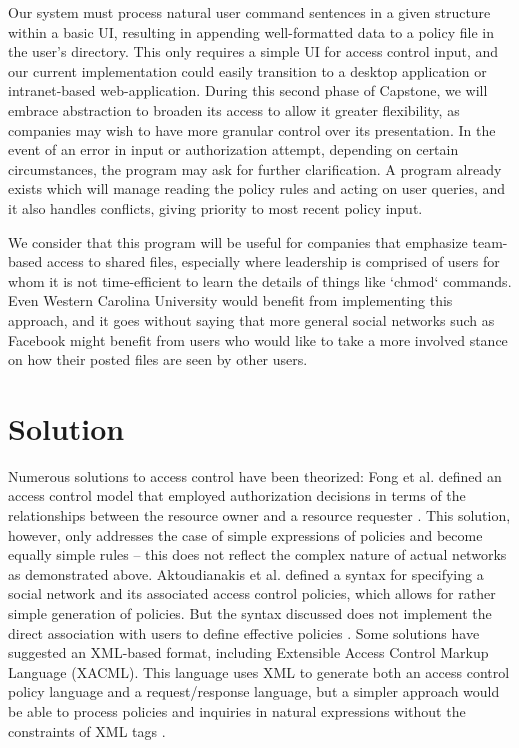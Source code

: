 \documentclass[12pt]{article}
\begin{document}
Our system must process natural user command sentences in a given structure within a basic UI, resulting in appending well-formatted data to a policy file in the user's directory. This only requires a simple UI for access control input, and our current implementation could easily transition to a desktop application or intranet-based web-application. During this second phase of Capstone, we will embrace abstraction to broaden its access to allow it greater flexibility, as companies may wish to have more granular control over its presentation. In the event of an error in input or authorization attempt, depending on certain circumstances, the program may ask for further clarification. A program already exists which will manage reading the policy rules and acting on user queries, and it also handles conflicts, giving priority to most recent policy input.

We consider that this program will be useful for companies that emphasize team-based access to shared files, especially where leadership is comprised of users for whom it is not time-efficient to learn the details of things like `chmod` commands. Even Western Carolina University would benefit from implementing this approach, and it goes without saying that more general social networks such as Facebook might benefit from users who would like to take a more involved stance on how their posted files are seen by other users.

\section{Solution}

Numerous solutions to access control have been theorized: Fong et al. defined an access control model that employed authorization decisions in terms of the relationships between the resource owner and a resource requester \cite{fong11}. This solution, however, only addresses the case of simple expressions of policies and become equally simple rules -- this does not reflect the complex nature of actual networks as demonstrated above. Aktoudianakis et al. defined a syntax for specifying a social network and its associated access control policies, which allows for rather simple generation of policies. But the syntax discussed does not implement the direct association with users to define effective policies \cite{aktoudianakis13}. Some solutions have suggested an XML-based format, including Extensible Access Control Markup Language (XACML). This language uses XML to generate both an access control policy language and a request/response language, but a simpler approach would be able to process policies and inquiries in natural expressions without the constraints of XML tags \cite{damiani02}.
\end{document}
